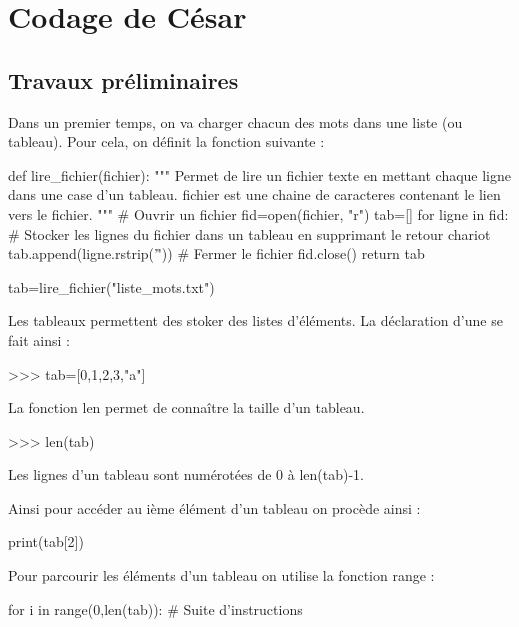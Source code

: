 \documentclass[11pt,oneside]{article}
\begin{document}


\section*{Codage de César}
\setcounter{paragraph}{0}

\subsection*{Travaux préliminaires}


Dans un premier temps, on va charger chacun des mots dans une liste (ou tableau). Pour cela, on définit la fonction suivante : 

\begin{py}
\begin{python}
def lire_fichier(fichier):
    """
    Permet de lire un fichier texte en mettant chaque ligne dans une case d'un tableau.
    fichier est une chaine de caracteres contenant le lien vers le fichier.
    """
    # Ouvrir un fichier
    fid=open(fichier, "r")
    tab=[]
    for ligne in fid:
       # Stocker les lignes du fichier dans un tableau en supprimant le retour chariot
        tab.append(ligne.rstrip('\n\r'))
    # Fermer le fichier
    fid.close()
    return tab

tab=lire_fichier("liste_mots.txt")

\end{python}
\end{py}

\begin{py}
Les tableaux permettent des stoker des listes d'éléments. La déclaration d'une se fait ainsi :
\begin{python}
>>>  tab=[0,1,2,3,"a"]
\end{python}


La fonction \textsf{len} permet de connaître la taille d'un tableau.
\begin{python}
>>>  len(tab)
\end{python}

Les lignes d'un tableau sont numérotées de 0 à \textsf{len(tab)-1}.

Ainsi pour accéder au ième élément d'un tableau on procède ainsi :
\begin{python}
print(tab[2])
\end{python}

Pour parcourir les éléments d'un tableau on utilise la fonction \textsf{range} : 
\begin{python}
for i in range(0,len(tab)):
     # Suite d'instructions
\end{python}
\end{py}
\end{document}

